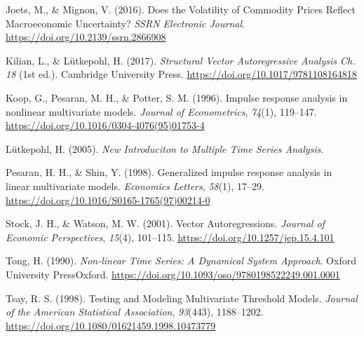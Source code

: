\documentclass[
  11pt,
]{article}
\newlength{\cslhangindent}
\newenvironment{CSLReferences}[2] %
 {\begin{list}{}{%
  \setlength{\itemindent}{0pt}
  \setlength{\leftmargin}{0pt}
  \setlength{\parsep}{0pt}
  \ifodd #1
   \setlength{\leftmargin}{\cslhangindent}
   \setlength{\itemindent}{-1\cslhangindent}
  \fi
  \setlength{\itemsep}{#2\baselineskip}}}
 {\end{list}}
\begin{document}
\label{refs}
\begin{CSLReferences}{1}{0}
Joets, M., \& Mignon, V. (2016). Does the {Volatility} of {Commodity Prices Reflect Macroeconomic Uncertainty}? \emph{SSRN Electronic Journal}. \url{https://doi.org/10.2139/ssrn.2866908}

Kilian, L., \& Lütkepohl, H. (2017). \emph{Structural {Vector Autoregressive Analysis Ch}. 18} (1st ed.). Cambridge University Press. \url{https://doi.org/10.1017/9781108164818}

Koop, G., Pesaran, M. H., \& Potter, S. M. (1996). Impulse response analysis in nonlinear multivariate models. \emph{Journal of Econometrics}, \emph{74}(1), 119--147. \url{https://doi.org/10.1016/0304-4076(95)01753-4}

Lütkepohl, H. (2005). \emph{New {Introduciton} to {Multiple Time Series Analysis}}.

Pesaran, H. H., \& Shin, Y. (1998). Generalized impulse response analysis in linear multivariate models. \emph{Economics Letters}, \emph{58}(1), 17--29. \url{https://doi.org/10.1016/S0165-1765(97)00214-0}

Stock, J. H., \& Watson, M. W. (2001). Vector {Autoregressions}. \emph{Journal of Economic Perspectives}, \emph{15}(4), 101--115. \url{https://doi.org/10.1257/jep.15.4.101}

Tong, H. (1990). \emph{Non-linear {Time Series}: {A Dynamical System Approach}}. Oxford University PressOxford. \url{https://doi.org/10.1093/oso/9780198522249.001.0001}

Tsay, R. S. (1998). Testing and {Modeling Multivariate Threshold Models}. \emph{Journal of the American Statistical Association}, \emph{93}(443), 1188--1202. \url{https://doi.org/10.1080/01621459.1998.10473779}

\end{CSLReferences}

\clearpage
\appendix
{}
\end{document}
